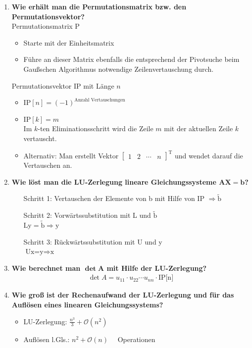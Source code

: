 \begin{enumerate}
		\item \textbf{Wie erhält man die Permutationsmatrix bzw. den Permutationsvektor?} \\
			Permutationsmatrix P
			\begin{itemize}
				\item Starte mit der Einheitsmatrix
				\item Führe an dieser Matrix ebenfalls die entsprechend der Pivotsuche beim Gaußschen Algorithmus notwendige Zeilenvertauschung durch.
			\end{itemize}
			Permutationsvektor IP mit Länge \(n\)
			\begin{itemize}
				\item \(\text{IP}[n]=(-1)^{\text{Anzahl Vertauschungen}}\)
				\item \(\text{IP}[k]=m\) \\
					Im \(k\)-ten Eliminationsschritt wird die Zeile \(m\) mit der aktuellen Zeile \(k\) vertauscht.
				\item Alternativ: Man erstellt Vektor \(\begin{bmatrix}
				1 & 2 & \cdots & n
				\end{bmatrix}^\text{T}\) und wendet darauf die Vertauschen an.
			\end{itemize}
		
		\item \textbf{Wie löst man die LU-Zerlegung lineare Gleichungssysteme \(\mathbf{AX=b}\)?} \\
			\begin{enumerate}
				\item[Schritt 1:] Vertauschen der Elemente von b mit Hilfe von IP \(\Rightarrow\tilde{\text{b}}\)
				\item[Schritt 2:] Vorwärtssubstitution mit L und \(\tilde{\text{b}}\) \\
				\(\text{Ly}=\tilde{\text{b}}\Rightarrow\text{y}\)
				\item[Schritt 3:] Rückwärtssubstitution mit U und y \\
				\(\text{Ux=y}\Rightarrow \text{x}\)
			\end{enumerate}
		
		\item \textbf{Wie berechnet man \(\mathbf{\det A}\) mit Hilfe der LU-Zerlegung?}
			\begin{align*}
				\det{A}=u_{11}\cdot u_{22}\cdots u_{nn}\cdot\text{IP[n]}
			\end{align*}
		
		\item \textbf{Wie groß ist der Rechenaufwand der LU-Zerlegung und für das Auflösen eines linearen Gleichungssystems?}
			\begin{itemize}
				\item LU-Zerlegung: \(\frac{n^3}{3}+\mathcal{O}(n^2) \quad\) 
				\item Auflösen l.Gls.: \(n^2+\mathcal{O}(n) \quad\) Operationen
			\end{itemize}
		

\end{enumerate}
